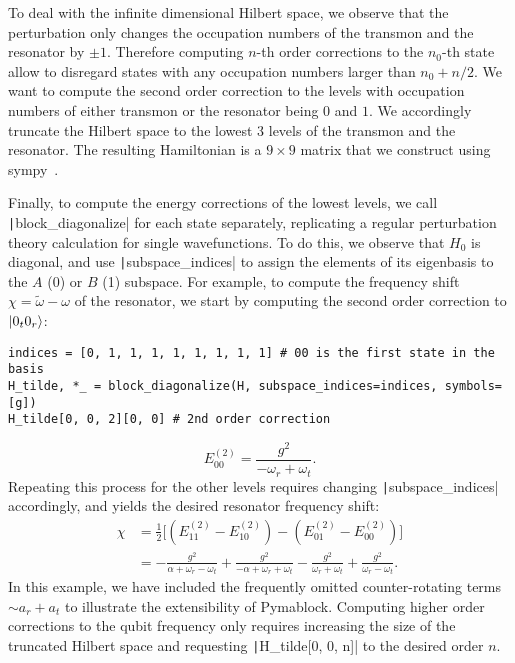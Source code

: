 To deal with the infinite dimensional Hilbert space, we observe that the perturbation only changes the occupation numbers of the transmon and the resonator by $\pm 1$.
Therefore computing $n$-th order corrections to the $n_0$-th state allow to disregard states with any occupation numbers larger than $n_0 + n/2$.
We want to compute the second order correction to the levels with occupation numbers of either transmon or the resonator being $0$ and $1$.
We accordingly truncate the Hilbert space to the lowest 3 levels of the transmon and the resonator.
The resulting Hamiltonian is a $9 \times 9$ matrix that we construct using sympy~\cite{Meurer_2017}.

Finally, to compute the energy corrections of the lowest levels, we call \texttt|block_diagonalize| for each state separately, replicating a regular perturbation theory calculation for single wavefunctions.
To do this, we observe that $H_0$ is diagonal, and use \texttt|subspace_indices| to assign the elements of its eigenbasis to the $A$ (0) or $B$ (1) subspace.
For example, to compute the frequency shift $\chi = \tilde{\omega} - \omega$ of the resonator, we start by computing the second order correction to $\ket{0_{t}0_{r}}$:
%
\begin{verbatim}
indices = [0, 1, 1, 1, 1, 1, 1, 1, 1] # 00 is the first state in the basis
H_tilde, *_ = block_diagonalize(H, subspace_indices=indices, symbols=[g])
H_tilde[0, 0, 2][0, 0] # 2nd order correction
\end{verbatim}
%
\begin{equation}
    E^{(2)}_{00} = \frac{g^{2}}{- \omega_{r} + \omega_{t}}.
\end{equation}
%
Repeating this process for the other levels requires changing \texttt|subspace_indices| accordingly, and yields the desired resonator frequency shift:
%
\begin{equation}
\begin{aligned}
\chi &= \frac{1}{2} \Big[(E^{(2)}_{11} - E^{(2)}_{10}) - (E^{(2)}_{01} - E^{(2)}_{00}) \Big] \\
& = - \frac{g^{2}}{\alpha + \omega_{r} - \omega_{t}} + \frac{g^{2}}{- \alpha + \omega_{r} + \omega_{t}} - \frac{g^{2}}{\omega_{r} + \omega_{t}} + \frac{g^{2}}{\omega_{r} - \omega_{t}}.
\end{aligned}
\end{equation}
%
In this example, we have included the frequently omitted counter-rotating terms $\sim a_{r} + a_{t}$ to illustrate the extensibility of Pymablock.
Computing higher order corrections to the qubit frequency only requires increasing the size of the truncated Hilbert space and requesting \texttt|H_tilde[0, 0, n]| to the desired order $n$.


